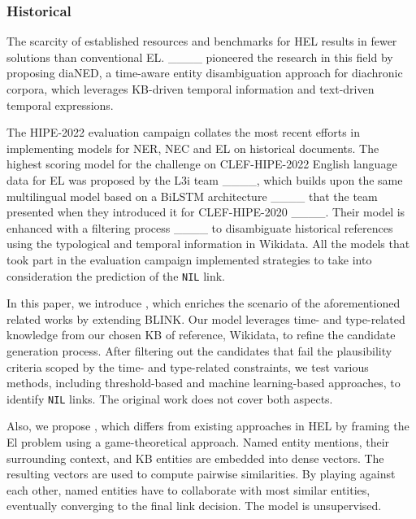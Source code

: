 \subsubsection*{Historical}
The scarcity of established resources and benchmarks for HEL results in fewer solutions than conventional EL.
____ pioneered the research in this field by proposing diaNED, a time-aware entity disambiguation approach for diachronic corpora, which leverages KB-driven temporal information and text-driven temporal expressions.

The HIPE-2022 evaluation campaign collates the most recent efforts in implementing models for NER, NEC and EL on historical documents.
The highest scoring model for the challenge on CLEF-HIPE-2022 English language data for EL was proposed by the L3i team ____, which builds upon the same multilingual model based on a BiLSTM architecture ____ that the team presented when they introduced it for CLEF-HIPE-2020 ____. %
Their model is enhanced with a filtering process ____ to disambiguate historical references using the typological and temporal information in Wikidata. All the models that took part in the evaluation campaign implemented strategies to take into consideration the prediction of the \texttt{NIL} link.

In this paper, we introduce \modelCBLINK{}, which enriches the scenario of the aforementioned related works by extending BLINK.
Our model leverages time- and type-related knowledge from our chosen KB of reference, Wikidata, to refine the candidate generation process.
After filtering out the candidates that fail the plausibility criteria scoped by the time- and type-related constraints, we test various methods, including threshold-based and machine learning-based approaches, to identify \texttt{NIL} links. The original work does not cover both aspects.

Also, we propose \modelEL{}, which differs from existing approaches in HEL by framing the El problem using a game-theoretical approach. Named entity mentions, their surrounding context, and KB entities are embedded into dense vectors. The resulting vectors are used to compute pairwise similarities. By playing against each other, named entities have to collaborate with most similar entities, eventually converging to the final link decision. The model is unsupervised.